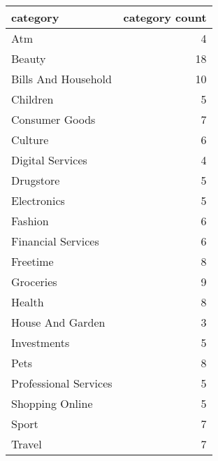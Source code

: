 \begin{tabular}{lr}
\toprule
             category &  category count \\
\midrule
                  Atm &               4 \\
               Beauty &              18 \\
  Bills And Household &              10 \\
             Children &               5 \\
       Consumer Goods &               7 \\
              Culture &               6 \\
     Digital Services &               4 \\
            Drugstore &               5 \\
          Electronics &               5 \\
              Fashion &               6 \\
   Financial Services &               6 \\
             Freetime &               8 \\
            Groceries &               9 \\
               Health &               8 \\
     House And Garden &               3 \\
          Investments &               5 \\
                 Pets &               8 \\
Professional Services &               5 \\
      Shopping Online &               5 \\
                Sport &               7 \\
               Travel &               7 \\
\bottomrule
\end{tabular}
